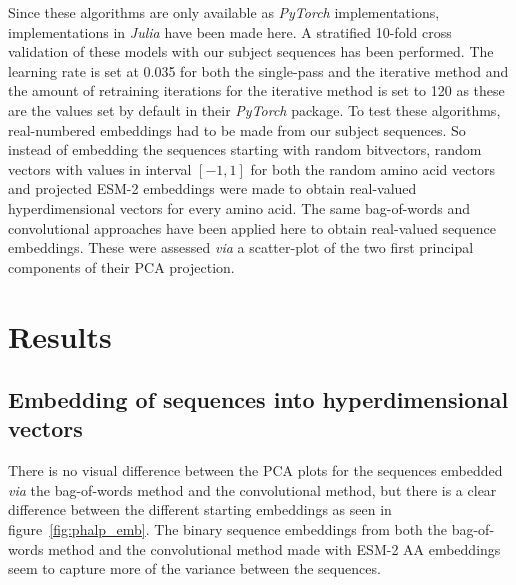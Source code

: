 Since these algorithms are only available as \textit{PyTorch} implementations, implementations in \textit{Julia} have been made here. A stratified 10-fold cross validation of these models with our subject sequences has been performed. The learning rate is set at 0.035 for both the single-pass and the iterative method and the amount of retraining iterations for the iterative method is set to 120 as these are the values set by default in their \textit{PyTorch} package. To test these algorithms, real-numbered embeddings had to be made from our subject sequences. So instead of embedding the sequences starting with random bitvectors, random vectors with values in interval $[-1, 1]$ for both the random amino acid vectors and projected ESM-2 embeddings were made to obtain real-valued hyperdimensional vectors for every amino acid. The same bag-of-words and convolutional approaches have been applied here to obtain real-valued sequence embeddings. These were assessed \textit{via} a scatter-plot of the two first principal components of their PCA projection.

\section{Results}
\subsection*{Embedding of sequences into hyperdimensional vectors}
There is no visual difference between the PCA plots for the sequences embedded \textit{via} the bag-of-words method and the convolutional method, but there is a clear difference between the different starting embeddings as seen in figure~\ref{fig:phalp_emb}. The binary sequence embeddings from both the bag-of-words method and the convolutional method made with ESM-2 AA embeddings seem to capture more of the variance between the sequences.

